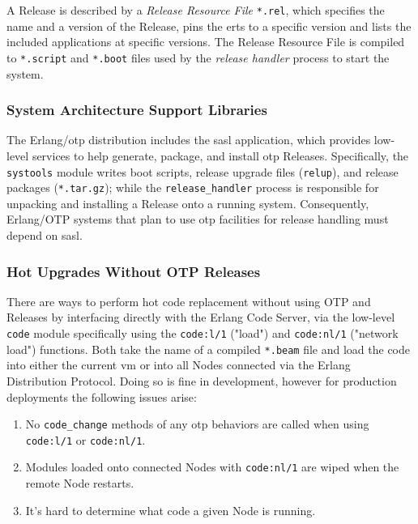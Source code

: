 A Release is described by a \emph{Release Resource File} \lstinline|*.rel|, which specifies the name and a version of the Release, pins the \acrshort{erts} to a specific version and lists the included applications at specific versions. The Release Resource File is compiled to \lstinline|*.script| and \lstinline|*.boot| files used by the \emph{release handler} process to start the system.


\subsubsection{System Architecture Support Libraries}

The Erlang/\acrshort{otp} distribution includes the \acrfull{sasl} application, which provides low-level services to help generate, package, and install \acrshort{otp} Releases. Specifically, the \lstinline|systools| module writes boot scripts, release upgrade files (\lstinline|relup|), and release packages (\lstinline|*.tar.gz|); while the \lstinline|release_handler| process is responsible for unpacking and installing a Release onto a running system. Consequently, Erlang/OTP systems that plan to use \acrshort{otp} facilities for release handling must depend on \acrshort{sasl}.


\subsubsection{Hot Upgrades Without OTP Releases}

There are ways to perform hot code replacement without using OTP and Releases by interfacing directly with the Erlang Code Server, via the low-level \lstinline|code| module specifically using the \lstinline|code:l/1| ("load") and \lstinline|code:nl/1| ("network load") functions. Both take the name of a compiled \lstinline|*.beam| file and load the code into either the current \acrshort{vm} or into all Nodes connected via the Erlang Distribution Protocol. Doing so is fine in development, however for production deployments the following issues arise:

\begin{enumerate}
\item No \lstinline|code_change| methods of any \acrshort{otp} behaviors are called when using \lstinline|code:l/1| or \lstinline|code:nl/1|.
\item Modules loaded onto connected Nodes with \lstinline|code:nl/1| are wiped when the remote Node restarts.
\item It's hard to determine what code a given Node is running.
\end{enumerate}

